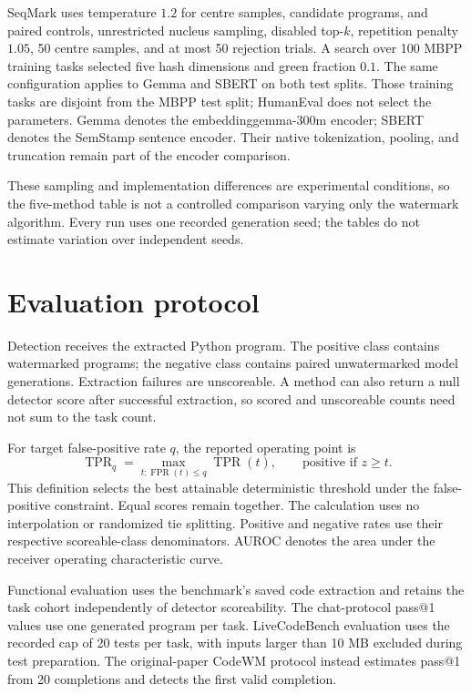 \documentclass[11pt]{article}
\begin{document}
SeqMark uses temperature $1.2$ for centre samples, candidate programs, and
paired controls, unrestricted nucleus sampling, disabled top-$k$, repetition
penalty $1.05$, 50 centre samples, and at most 50 rejection trials. A search
over 100 MBPP training tasks selected five hash dimensions and green fraction
$0.1$. The same configuration applies to Gemma and SBERT on both test splits.
Those training tasks are disjoint from the MBPP test split; HumanEval does
not select the parameters. Gemma denotes the embeddinggemma-300m encoder;
SBERT denotes the SemStamp sentence encoder. Their native tokenization,
pooling, and truncation remain part of the encoder comparison.

These sampling and implementation differences are experimental conditions,
so the five-method table is not a controlled comparison varying only the
watermark algorithm. Every run uses one recorded generation seed; the tables
do not estimate variation over independent seeds.

\section{Evaluation protocol}

Detection receives the extracted Python program. The positive class contains
watermarked programs; the negative class contains paired unwatermarked model
generations. Extraction failures are unscoreable. A method can also return a
null detector score after successful extraction, so scored and unscoreable
counts need not sum to the task count.

For target false-positive rate $q$, the reported operating point is
\[
\operatorname{TPR}_{q}=\max_{t:\operatorname{FPR}(t)\le q}
\operatorname{TPR}(t),\qquad \text{positive if } z\ge t.
\]
This definition selects the best attainable deterministic threshold under
the false-positive constraint. Equal scores remain together. The calculation
uses no interpolation or randomized tie splitting. Positive and negative
rates use their respective scoreable-class denominators. AUROC denotes the
area under the receiver operating characteristic curve.

Functional evaluation uses the benchmark's saved code extraction and retains
the task cohort independently of detector scoreability. The chat-protocol
pass@1 values use one generated program per task. LiveCodeBench evaluation
uses the recorded cap of 20 tests per task, with inputs larger than 10 MB
excluded during test preparation. The original-paper CodeWM protocol instead
estimates pass@1 from 20 completions and detects the first valid completion.
\end{document}
